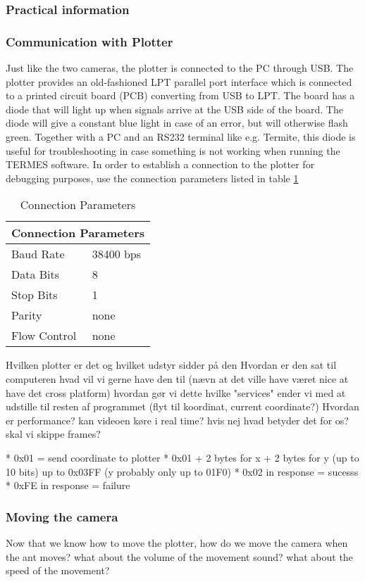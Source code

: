 \subsubsection{Practical information}

\subsubsection{Communication with Plotter}
Just like the two cameras, the plotter is connected to the PC through USB. The plotter provides an old-fashioned LPT parallel port interface which is connected to a printed circuit board (PCB) converting from USB to LPT. The board has a diode that will light up when signals arrive at the USB side of the board. The diode will give a constant blue light in case of an error, but will otherwise flash green. Together with a PC and an RS232 terminal like e.g. Termite, this diode is useful for troubleshooting in case something is not working when running the TERMES software. In order to establish a connection to the plotter for debugging purposes, use the connection parameters listed in table \ref{table:connparam}

\begin{table}[h]
\centering
\renewcommand{\arraystretch}{1.1}
\setlength{\tabcolsep}{8pt}
	\begin{tabular}{ |l|l| }
  	\hline
  	\multicolumn{2}{|c|}{Connection Parameters} \\
  	\hline
  	Baud Rate & 38400 bps \\
  	Data Bits & 8 \\
  	Stop Bits & 1 \\
  	Parity & none \\
  	Flow Control & none \\
  	\hline
	\end{tabular}
	\caption{Connection Parameters}
	\label{table:connparam}
\end{table}








Hvilken plotter er det og hvilket udstyr sidder på den
Hvordan er den sat til computeren
hvad vil vi gerne have den til (nævn at det ville have været nice at have det cross platform)
hvordan gør vi dette
hvilke "services" ender vi med at udstille til resten af programmet (flyt til koordinat, current coordinate?)
Hvordan er performance? kan videoen køre i real time? hvis nej hvad betyder det for os? skal vi skippe frames?

*   0x01 = send coordinate to plotter
 *   0x01 + 2 bytes for x + 2 bytes for y (up to 10 bits) up to 0x03FF (y probably only up to 01F0)
 *   0x02 in response = sucesss
 *   0xFE in response = failure
 
\subsubsection{Moving the camera}
Now that we know how to move the plotter, how do we move the camera when the ant moves?
what about the volume of the movement sound?
what about the speed of the movement?
